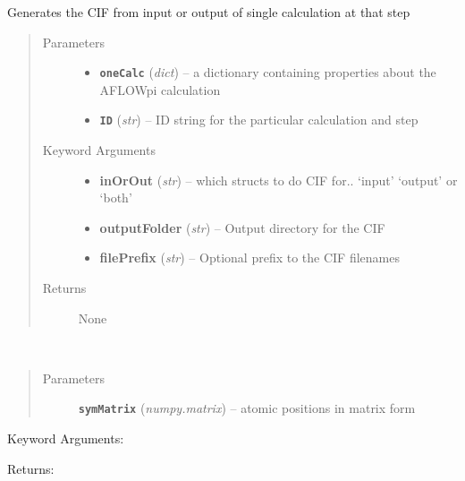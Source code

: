 \documentclass[letterpaper,10pt,english]{sphinxmanual}
\begin{document}

\begin{fulllineitems}
\label{retr:retr.__pw2cif}
Generates the CIF from input or output of single calculation at that step
\begin{quote}\begin{description}
\item[{Parameters}] \leavevmode\begin{itemize}
\item {} 
\textbf{\texttt{oneCalc}} (\emph{dict}) -- a dictionary containing properties about the AFLOWpi calculation

\item {} 
\textbf{\texttt{ID}} (\emph{str}) -- ID string for the particular calculation and step

\end{itemize}

\item[{Keyword Arguments}] \leavevmode\begin{itemize}
\item {} 
\textbf{inOrOut} (\emph{str}) --
which structs to do CIF for.. `input' `output' or `both'

\item {} 
\textbf{outputFolder} (\emph{str}) --
Output directory for the CIF

\item {} 
\textbf{filePrefix} (\emph{str}) --
Optional prefix to the CIF filenames

\end{itemize}

\item[{Returns}] \leavevmode
None

\end{description}\end{quote}

\end{fulllineitems}


\begin{fulllineitems}
\label{retr:retr.__reduceDuplicates}~\begin{quote}\begin{description}
\item[{Parameters}] \leavevmode
\textbf{\texttt{symMatrix}} (\emph{numpy.matrix}) -- atomic positions in matrix form

\end{description}\end{quote}

Keyword Arguments:

Returns:

\end{fulllineitems}
\end{document}
